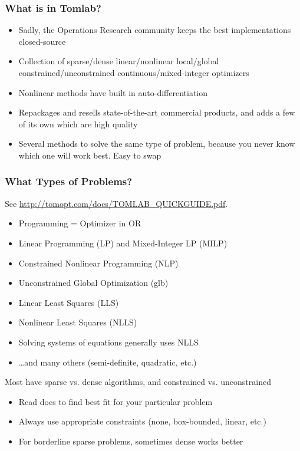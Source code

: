 \documentclass[nofootline]{etk-presentation}
\begin{document}
\begin{frame}[fragile]	\frametitle{What is in Tomlab?}
	\begin{itemize}
		\item Sadly, the Operations Research community keeps the best implementations closed-source
		\item Collection of sparse/dense linear/nonlinear local/global constrained/unconstrained continuous/mixed-integer optimizers
		\item Nonlinear methods have built in auto-differentiation
		\item Repackages and resells state-of-the-art commercial products, and adds a few of its own which are high quality		
		\item Several methods to solve the same type of problem, because you never know which one will work best.  Easy to swap
	\end{itemize}
\end{frame}

\begin{frame}[fragile]	\frametitle{What Types of Problems?}
	See \url{http://tomopt.com/docs/TOMLAB_QUICKGUIDE.pdf}. 
	\begin{itemize}
		\item Programming = Optimizer in OR
		\item Linear Programming (LP) and Mixed-Integer LP (MILP)
		\item Constrained Nonlinear Programming (NLP)
		\item Unconstrained Global Optimization (glb)
		\item Linear Least Squares (LLS)
		\item Nonlinear Least Squares (NLLS)
		\item Solving systems of equations generally uses NLLS
		\item \ldots and many others (semi-definite, quadratic, etc.)
	\end{itemize}
\medskip
	Most have sparse vs. dense algorithms, and constrained vs. unconstrained
	\begin{itemize}
		\item Read docs to find best fit for your particular problem
		\item Always use appropriate constraints (none, box-bounded, linear, etc.)
		\item For borderline sparse problems, sometimes dense works better
	\end{itemize}
\end{frame}
\end{document}
